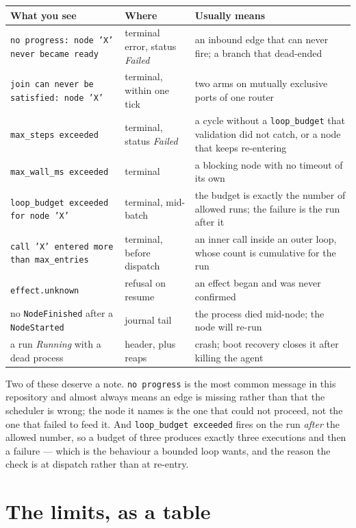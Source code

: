 \begin{longtable}{@{}p{}p{}p{}@{}}
	\toprule
	\textbf{What you see} & \textbf{Where} & \textbf{Usually means} \\
	\midrule
	\endhead
	\texttt{no progress: node 'X' never became ready} & terminal error, status
	\emph{Failed} & an inbound edge that can never fire; a branch that dead-ended \\
	\texttt{join can never be satisfied: node 'X'} & terminal, within one tick & two arms on mutually
	exclusive ports of one router \\
	\texttt{max\_steps exceeded} & terminal, status \emph{Failed} & a cycle without a
	\texttt{loop\_budget} that validation did not catch, or a node that keeps re-entering \\
	\texttt{max\_wall\_ms exceeded} & terminal & a blocking node with no timeout of its own \\
	\texttt{loop\_budget exceeded for node 'X'} & terminal, mid-batch & the budget is exactly the
	number of allowed runs; the failure is the run after it \\
	\texttt{call 'X' entered more than max\_entries} & terminal, before dispatch & an inner call
	inside an outer loop, whose count is cumulative for the run \\
	\texttt{effect.unknown} & refusal on resume & an effect began and was never confirmed \\
	no \texttt{NodeFinished} after a \texttt{NodeStarted} & journal tail & the process died
	mid-node; the node will re-run \\
	a run \emph{Running} with a dead process & header, plus reaps & crash; boot recovery closes it
	after killing the agent \\
	\bottomrule
\end{longtable}

Two of these deserve a note. \texttt{no progress} is the most common message in this repository and
almost always means an edge is missing rather than that the scheduler is wrong; the node it names is
the one that could not proceed, not the one that failed to feed it. And \texttt{loop\_budget
exceeded} fires on the run \emph{after} the allowed number, so a budget of three produces exactly
three executions and then a failure --- which is the behaviour a bounded loop wants, and the reason
the check is at dispatch rather than at re-entry.

\section{The limits, as a table}

